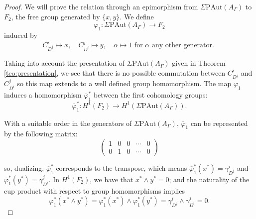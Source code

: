 \documentclass[a4paper]{amsart}
\newcommand{\G}{\Gamma}
\newcommand{\A}{{A_\Gamma}}
\newcommand{\PAut}{\Sigma\mathrm{PAut}}
\theoremstyle{definition}
\theoremstyle{remark}
\begin{document}
\begin{proof}
    We will prove the relation through an epimorphism from $\PAut(A_\G)$ to $F_2$, the free group generated by $\{x,y\}$. We define 
    $$
\varphi_1: \PAut(A_\G) \rightarrow F_2
    $$
    induced by 
    $$
    C_{D^j}^i\mapsto x, \quad
   C_{D^i}^j\mapsto y, \quad
    \alpha\mapsto1 \textrm{ for } \alpha \textrm{ any other generator. } 
    $$

 \noindent Taking into account the presentation of $\PAut(\A)$ given in Theorem \ref{teo:presentation}, we see that there is no possible commutation between $C_{D^j}^i$ and $C_{D^i}^j$ so this map extends to a well defined group homomorphism. The map $\varphi_1$ induces  a homomorphism $\overline{\varphi}_1^*$ between the first cohomology  groups:
$$
\overline{\varphi}_1^*:H^1(F_2) \rightarrow H^1(\PAut(A_\G)).
$$

\noindent With a suitable order in the generators of $\PAut(A_\G)$, $\overline{\varphi}_1$ can be represented by the following matrix:
$$
\begin{pmatrix}
1 & 0 & 0 & \cdots & 0 \\
0 & 1 & 0 & \cdots & 0
\end{pmatrix}
$$

\noindent so, dualizing, $\overline{\varphi}_1^*$ corresponds to the transpose,
which means $\overline{\varphi}_1^*(x^*)=\gamma_{D^j}^i$ and $\overline{\varphi}_1^*(y^*)=\gamma_{D^i}^j$.
In $H^1(F_2)$, we have that $x^*\wedge y^*=0$; and the naturality of the cup product with respect to group homomorphisms implies
$$
\varphi_1^*(x^*\wedge y^*)=\varphi_1^*(x^*)\wedge\varphi_1^*(y^*)=\gamma_{D^j}^i\wedge \gamma_{D^i}^j=0.
$$
\end{proof}
\end{document}
